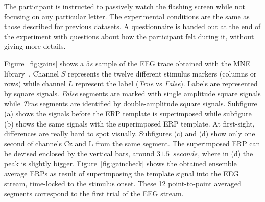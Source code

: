 The participant is instructed to passively watch the flashing screen while not focusing on any particular letter.  The experimental conditions are the same as those described for previous datasets.  A questionnaire is handed out at the end of the experiment with questions about how the participant felt during it, without giving more details.  


Figure~\ref{fig:gains} shows a $5s$ sample of the EEG trace obtained with the MNE library~\cite{Gramfort2013}.  Channel $S$ represents the twelve different stimulus markers (columns or rows) while channel $L$ represent the label (\textit{True} vs \textit{False}).  Labels are represented by square signals.  \textit{False} segments are marked with single amplitude square signals while \textit{True} segments are identified by double-amplitude square signals.  Subfigure (a) shows the signals before the ERP template is superimposed while subfigure (b) shows the same signals with the superimposed ERP template.  At first-sight, differences are really hard to spot visually.  Subfigures (c) and (d) show only one second of channels Cz and L from the same segment.  The superimposed ERP can be devised enclosed by the vertical bars, around $31.5$~$\si{seconds}$, where in (d) the peak is slightly bigger.  Figure~\ref{fig:gaincheck} shows the obtained ensemble average ERPs as result of superimposing the template signal into the EEG stream, time-locked to the stimulus onset.   These 12 point-to-point averaged segments correspond to the first trial of the EEG stream.


